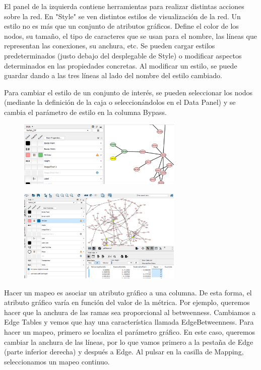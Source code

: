 \documentclass[nochap]{config/ejercicios}
\begin{document}
El panel de la izquierda contiene herramientas para realizar distintas acciones sobre la red. En "Style" se ven distintos estilos de visualización de la red. Un estilo no es más que un conjunto de atributos gráficos. Define el color de los nodos, su tamaño, el tipo de caracteres que se usan para el nombre, las líneas que representan las conexiones, su anchura, etc. Se pueden cargar estilos predeterminados (justo debajo del desplegable de Style) o modificar aspectos determinados en las propiedades concretas. Al modificar un estilo, se puede guardar dando a las tres líneas al lado del nombre del estilo cambiado. 

Para cambiar el estilo de un conjunto de interés, se pueden seleccionar los nodos (mediante la definición de la caja o seleccionándolos en el Data Panel) y se cambia el parámetro de estilo en la columna Bypass.

\begin{figure}[h]
\centering
\includegraphics[width = 0.7\textwidth]{figs/style.png}
\end{figure}

\begin{figure}[h]
\centering
\includegraphics[width = 0.7\textwidth]{figs/style-specific.png}
\end{figure}

Hacer un mapeo es asociar un atributo gráfico a una columna. De esta forma, el atributo gráfico varía en función del valor de la métrica. Por ejemplo, queremos hacer que la anchura de las ramas sea proporcional al betweenness. Cambiamos a Edge Tables y vemos que hay una característica llamada EdgeBetweenness. Para hacer un mapeo, primero se localiza el parámetro gráfico. En este caso, queremos cambiar la anchura de las líneas, por lo que vamos primero a la pestaña de Edge (parte inferior derecha) y después a Edge. Al pulsar en la casilla de Mapping, seleccionamos un mapeo continuo.
\end{document}
